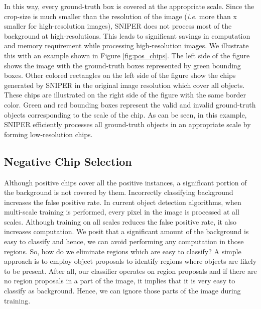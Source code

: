 \documentclass{article}
\begin{document}
In this way, every ground-truth box is covered at the appropriate scale. Since the crop-size is much smaller than the resolution of the image (\textit{i.e.} more than x smaller for high-resolution images), SNIPER does not process most of the background at high-resolutions. This leads to significant savings in computation and memory requirement while processing high-resolution images. We illustrate this with an example shown in Figure \ref{fig:pos_chips}. The left side of the figure shows the image with the ground-truth boxes represented by green bounding boxes. Other colored rectangles on the left side of the figure show the chips generated by SNIPER in the original image resolution which cover all objects. These chips are illustrated on the right side of the figure with the same border color. Green and red bounding boxes represent the valid and invalid ground-truth objects corresponding to the scale of the chip. As can be seen, in this example, SNIPER efficiently processes all ground-truth objects in an appropriate scale by forming  low-resolution chips.


\subsection{Negative Chip Selection}
\label{sec:neg}
Although positive chips cover all the positive instances, a significant portion of the background is not covered by them. Incorrectly classifying background increases the false positive rate. In current object detection algorithms, when multi-scale training is performed, every pixel in the image is processed at all scales. Although training on all scales reduces the false positive rate, it also increases computation. We posit that a significant amount of the background is easy to classify and hence, we can avoid performing any computation in those regions. So, how do we eliminate regions which are easy to classify? A simple approach is to employ object proposals to identify regions where objects are likely to be present. After all, our classifier operates on region proposals and if there are no region proposals in a part of the image, it implies that it is very easy to classify as background. Hence, we can ignore those parts of the image during training.
\end{document}
